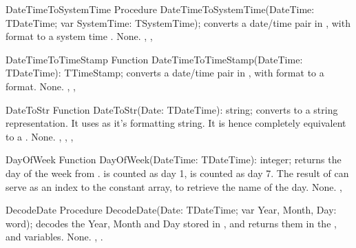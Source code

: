 

\begin{procedure}{DateTimeToSystemTime}
\Declaration
Procedure DateTimeToSystemTime(DateTime: TDateTime; var SystemTime: TSystemTime);
\Description
{} converts a date/time pair in , with
 format to a system time .
\Errors
None.
\SeeAlso
{}, ,
\end{procedure}



\begin{function}{DateTimeToTimeStamp}
\Declaration
Function DateTimeToTimeStamp(DateTime: TDateTime): TTimeStamp;
\Description
{} converts a date/time pair in , with
 format to a  format.
\Errors
None.
\SeeAlso
{}, ,
\end{function}



\begin{function}{DateToStr}
\Declaration
Function DateToStr(Date: TDateTime): string;
\Description
{} converts  to a string representation. It uses
 as it's formatting string. It is hence completely
equivalent to a .
\Errors
None.
\SeeAlso
{}, , ,
\end{function}




\begin{function}{DayOfWeek}
\Declaration
Function DayOfWeek(DateTime: TDateTime): integer;
\Description
{} returns the day of the week from .
 is counted as day 1,  is counted as
day 7. The result of  can serve as an index to
the  constant array, to retrieve the name of
the day.
\Errors
None.
\SeeAlso
{}, 
\end{function}




\begin{procedure}{DecodeDate}
\Declaration
Procedure DecodeDate(Date: TDateTime; var Year, Month, Day: word);
\Description
{} decodes the Year, Month and Day stored in ,
and returns them in the ,  and  variables.
\Errors
None.
\SeeAlso
{}, .
\end{procedure}

